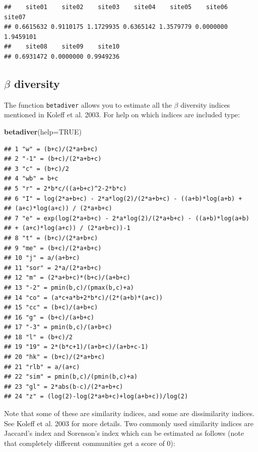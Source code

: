 \documentclass[]{book}
\newenvironment{Shaded}{\begin{snugshade}}{\end{snugshade}}
\newcommand{\KeywordTok}[1]{\textcolor[rgb]{0.13,0.29,0.53}{\textbf{{#1}}}}
\newcommand{\DataTypeTok}[1]{\textcolor[rgb]{0.13,0.29,0.53}{{#1}}}
\newcommand{\OtherTok}[1]{\textcolor[rgb]{0.56,0.35,0.01}{{#1}}}
\newcommand{\NormalTok}[1]{{#1}}
\begin{document}
\begin{verbatim}
##    site01    site02    site03    site04    site05    site06    site07 
## 0.6615632 0.9110175 1.1729935 0.6365142 1.3579779 0.0000000 1.9459101 
##    site08    site09    site10 
## 0.6931472 0.0000000 0.9949236
\end{verbatim}

\subsection{\texorpdfstring{\(\beta\)
diversity}{\textbackslash{}beta diversity}}\label{beta-diversity}

The function \texttt{betadiver} allows you to estimate all the \(\beta\)
diversity indices mentioned in Koleff et al. 2003. For help on which
indices are included type:

\begin{Shaded}
\begin{Highlighting}[]
\KeywordTok{betadiver}\NormalTok{(}\DataTypeTok{help=}\OtherTok{TRUE}\NormalTok{)}
\end{Highlighting}
\end{Shaded}

\begin{verbatim}
## 1 "w" = (b+c)/(2*a+b+c)
## 2 "-1" = (b+c)/(2*a+b+c)
## 3 "c" = (b+c)/2
## 4 "wb" = b+c
## 5 "r" = 2*b*c/((a+b+c)^2-2*b*c)
## 6 "I" = log(2*a+b+c) - 2*a*log(2)/(2*a+b+c) - ((a+b)*log(a+b) +
## (a+c)*log(a+c)) / (2*a+b+c)
## 7 "e" = exp(log(2*a+b+c) - 2*a*log(2)/(2*a+b+c) - ((a+b)*log(a+b)
## + (a+c)*log(a+c)) / (2*a+b+c))-1
## 8 "t" = (b+c)/(2*a+b+c)
## 9 "me" = (b+c)/(2*a+b+c)
## 10 "j" = a/(a+b+c)
## 11 "sor" = 2*a/(2*a+b+c)
## 12 "m" = (2*a+b+c)*(b+c)/(a+b+c)
## 13 "-2" = pmin(b,c)/(pmax(b,c)+a)
## 14 "co" = (a*c+a*b+2*b*c)/(2*(a+b)*(a+c))
## 15 "cc" = (b+c)/(a+b+c)
## 16 "g" = (b+c)/(a+b+c)
## 17 "-3" = pmin(b,c)/(a+b+c)
## 18 "l" = (b+c)/2
## 19 "19" = 2*(b*c+1)/(a+b+c)/(a+b+c-1)
## 20 "hk" = (b+c)/(2*a+b+c)
## 21 "rlb" = a/(a+c)
## 22 "sim" = pmin(b,c)/(pmin(b,c)+a)
## 23 "gl" = 2*abs(b-c)/(2*a+b+c)
## 24 "z" = (log(2)-log(2*a+b+c)+log(a+b+c))/log(2)
\end{verbatim}

Note that some of these are similarity indices, and some are
dissimilarity indices. See Koleff et al. 2003 for more details. Two
commonly used similarity indices are Jaccard's index and Sorenson's
index which can be estimated as follows (note that completely different
communities get a score of 0):
\end{document}
